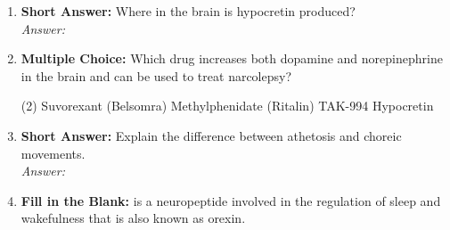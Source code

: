 \begin{enumerate}[label=\textbf{Q3.5.\arabic*}]
    \item \textbf{Short Answer:} Where in the brain is hypocretin produced? \\
        \textit{Answer:} %

    \item \textbf{Multiple Choice:} Which drug increases both dopamine and norepinephrine in the brain and can be used to treat narcolepsy?
        \begin{tasks}[label=\textcolor{\documentTheme}{(\Alph*)}, item-format=\color{\documentTheme}, label-width=1.5em, item-indent=1.7em](2)
            \task Suvorexant (Belsomra)
            \task Methylphenidate (Ritalin)
            \task TAK-994
            \task Hypocretin
        \end{tasks}

    \item \textbf{Short Answer:} Explain the difference between athetosis and choreic movements. \\
        \textit{Answer:} %

    \item \textbf{Fill in the Blank:} \underline{\hspace{3cm}} is a neuropeptide involved in the regulation of sleep and wakefulness that is also known as orexin.


        
\end{enumerate}